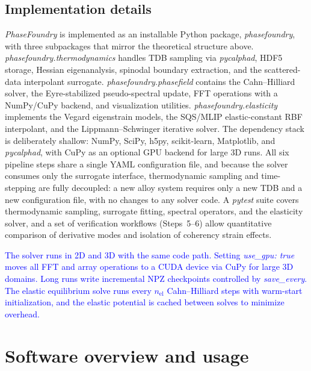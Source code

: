 \documentclass[12pt]{article}
\begin{document}
\subsection{Implementation details}

\textit{PhaseFoundry} is implemented as an installable Python package, \textit{phasefoundry}, with three subpackages that mirror the theoretical structure above. \textit{phasefoundry.thermodynamics} handles TDB sampling via \textit{pycalphad}, HDF5 storage, Hessian eigenanalysis, spinodal boundary extraction, and the scattered-data interpolant surrogate. \textit{phasefoundry.phasefield} contains the Cahn--Hilliard solver, the Eyre-stabilized pseudo-spectral update, FFT operations with a NumPy/CuPy backend, and visualization utilities. \textit{phasefoundry.elasticity} implements the Vegard eigenstrain models, the SQS/MLIP elastic-constant RBF interpolant, and the Lippmann--Schwinger iterative solver. The dependency stack is deliberately shallow: NumPy, SciPy, h5py, scikit-learn, Matplotlib, and \textit{pycalphad}, with CuPy as an optional GPU backend for large 3D runs. All six pipeline steps share a single YAML configuration file, and because the solver consumes only the surrogate interface, thermodynamic sampling and time-stepping are fully decoupled: a new alloy system requires only a new TDB and a new configuration file, with no changes to any solver code. A \textit{pytest} suite covers thermodynamic sampling, surrogate fitting, spectral operators, and the elasticity solver, and a set of verification workflows (Steps~5--6) allow quantitative comparison of derivative modes and isolation of coherency strain effects.

\textcolor{blue}{The solver runs in 2D and 3D with the same code path. Setting \emph{use\_gpu: true} moves all FFT and array operations to a CUDA device via CuPy for large 3D domains. Long runs write incremental NPZ checkpoints controlled by \emph{save\_every}. The elastic equilibrium solve runs every $n_{\mathrm{el}}$ Cahn--Hilliard steps with warm-start initialization, and the elastic potential is cached between solves to minimize overhead.}

\section{Software overview and usage}
\label{sec:usage}
\end{document}
